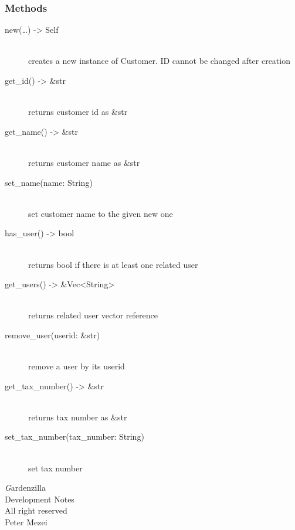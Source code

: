\documentclass{article}
\begin{document}
\subsubsection{Methods}

\begin{description}
  \item[new(\dots) -> Self] \hfill
    \\ creates a new instance of Customer. ID cannot be changed after
    creation
  \item[get\_id() -> \&str] \hfill
    \\ returns customer id as \&str
  \item[get\_name() -> \&str] \hfill
    \\ returns customer name as \&str
  \item[set\_name(name: String)] \hfill
    \\ set customer name to the given new one
  \item[has\_user() -> bool] \hfill
    \\ returns bool if there is at least one related user
  \item[get\_users() -> \&Vec<String>] \hfill
    \\ returns related user vector reference
  \item[remove\_user(userid: \&str)]  \hfill
    \\ remove a user by its userid
  \item[get\_tax\_number() -> \&str] \hfill
    \\ returns tax number as \&str
  \item[set\_tax\_number(tax\_number: String)] \hfill
    \\ set tax number
\end{description}

\newpage
\todototoc
\listoftodos

\newpage
\thispagestyle{empty}
\vspace*{5cm}
\begin{center}
  {\textit Gardenzilla\\ Development Notes \\ \vspace{5mm} All right reserved \\ Peter Mezei \\\the\year{}}
\end{center}
\end{document}
